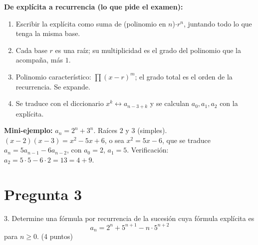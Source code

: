 \documentclass[11pt]{article}
\begin{document}
\textbf{De explícita a recurrencia (lo que pide el examen):}
\begin{enumerate}[leftmargin=1.6em]
\item Escribir la explícita como suma de (polinomio en $n$)$\cdot r^n$, juntando todo lo que tenga la misma base.
\item Cada base $r$ es una raíz; su multiplicidad es el grado del polinomio que la acompaña, más $1$.
\item Polinomio característico: $\prod (x-r)^m$; el grado total es el orden de la recurrencia. Se expande.
\item Se traduce con el diccionario $x^k\leftrightarrow a_{n-3+k}$ y se calculan $a_0,a_1,a_2$ con la explícita.
\end{enumerate}

\textbf{Mini-ejemplo:} $a_n=2^n+3^n$. Raíces $2$ y $3$ (simples). $(x-2)(x-3)=x^2-5x+6$, o sea $x^2=5x-6$, que se traduce $a_n=5a_{n-1}-6a_{n-2}$, con $a_0=2$, $a_1=5$. Verificación: $a_2=5\cdot 5-6\cdot 2=13=4+9$.

\clearpage
\section*{Pregunta 3}

3. Determine una \colorbox{green!35}{fórmula por recurrencia} de la sucesión cuya fórmula explícita es
\[
a_n=2^n+5^{n+1}-n\cdot 5^{n+2}
\]
para $n\ge 0$. \hfill (4 puntos)


\end{document}
